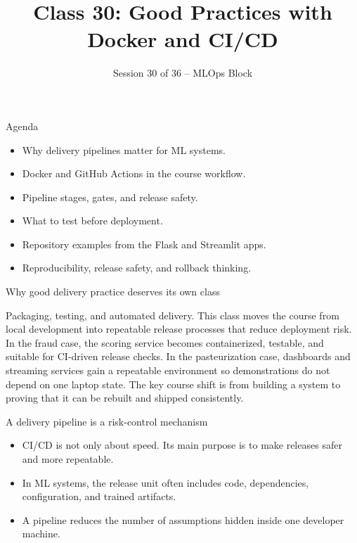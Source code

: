 

\title{Class 30: Good Practices with Docker and CI/CD}
\subtitle{Session 30 of 36 -- MLOps Block}
\author{\coursename}
\date{}



\frame{\titlepage \coursefooter}

\begin{frame}{Agenda}
\begin{itemize}
\item Why delivery pipelines matter for ML systems.
\item Docker and GitHub Actions in the course workflow.
\item Pipeline stages, gates, and release safety.
\item What to test before deployment.
\item Repository examples from the Flask and Streamlit apps.
\item Reproducibility, release safety, and rollback thinking.
\end{itemize}
\coursefooter
\end{frame}

\begin{frame}{Why good delivery practice deserves its own class}
\coursefooter
\end{frame}

\coursecontextframe
{Packaging, testing, and automated delivery.}
{This class moves the course from local development into repeatable release processes that reduce deployment risk.}
{In the fraud case, the scoring service becomes containerized, testable, and suitable for CI-driven release checks.}
{In the pasteurization case, dashboards and streaming services gain a repeatable environment so demonstrations do not depend on one laptop state.}
{The key course shift is from building a system to proving that it can be rebuilt and shipped consistently.}

\begin{frame}{A delivery pipeline is a risk-control mechanism}
\begin{itemize}
\item CI/CD is not only about speed. Its main purpose is to make releases safer and more repeatable.
\item In ML systems, the release unit often includes code, dependencies, configuration, and trained artifacts.
\item A pipeline reduces the number of assumptions hidden inside one developer machine.
\end{itemize}
\coursefooter
\end{frame}

